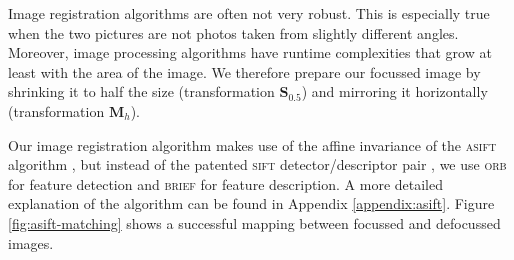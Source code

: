 \documentclass[10pt]{book}
\begin{document}
Image registration algorithms are often not very robust. This is especially true
when the two pictures are not photos taken from slightly different angles.
Moreover, image processing algorithms have runtime complexities that grow at
least with the area of the image. We therefore prepare our focussed image by
shrinking it to half the size (transformation $\mathbf{S}_{0.5}$) and mirroring
it horizontally (transformation $\mathbf{M}_h$).

Our image registration algorithm makes use of the affine invariance of the
\textsc{asift}
algorithm \cite{}, but instead of the patented \textsc{sift} detector/descriptor pair
\cite{}, we use \textsc{orb} \cite{} for feature detection and \textsc{brief} \cite{} for feature
description. A more detailed explanation of the algorithm can be found in
Appendix \ref{appendix:asift}. Figure \ref{fig:asift-matching} shows a
successful mapping between focussed and defocussed images.
\end{document}
